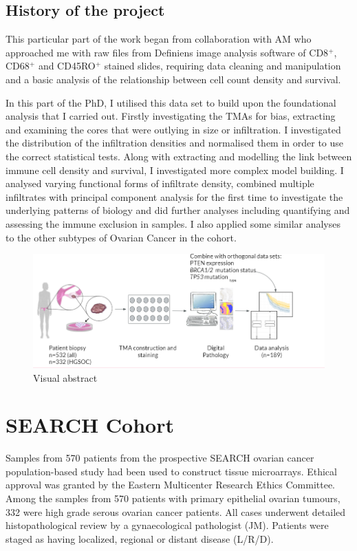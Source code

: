 \subsection{History of the project}
This particular part of the work began from collaboration with AM who approached me with raw files from Definiens image analysis software of CD8$^+$, CD68$^+$ and CD45RO$^+$ stained slides, requiring data cleaning and manipulation and a basic analysis of the relationship between cell count density and survival. 

In this part of the PhD, I utilised this data set to build upon the foundational analysis that I carried out. Firstly investigating the TMAs for bias, extracting and examining the cores that were outlying in size or infiltration. I investigated the distribution of the infiltration densities and normalised them in order to use the correct statistical tests. Along with extracting and modelling the link between immune cell density and survival, I investigated more complex model building. I analysed varying functional forms of infiltrate density, combined multiple infiltrates with principal component analysis for the first time to investigate the underlying patterns of biology and did further analyses including quantifying and assessing the immune exclusion in samples. I also applied some similar analyses to the other subtypes of Ovarian Cancer in the cohort.

\begin{figure}
    \centering
    \includegraphics{Chapter2/Figs/Raster/Thesis_visual_abstract.PNG}
    \caption[Visual Abstract]{Visual abstract}
    \label{fig:visual_abstract}
\end{figure}

\section{SEARCH Cohort}

Samples from 570 patients from the prospective SEARCH ovarian cancer population-based study had been used to construct tissue microarrays. Ethical approval was granted by the Eastern Multicenter Research Ethics Committee. Among the samples from 570 patients with primary epithelial ovarian tumours, 332 were high grade serous ovarian cancer patients. All cases underwent detailed histopathological review by a gynaecological pathologist (JM). Patients were staged as having localized, regional or distant disease (L/R/D).

